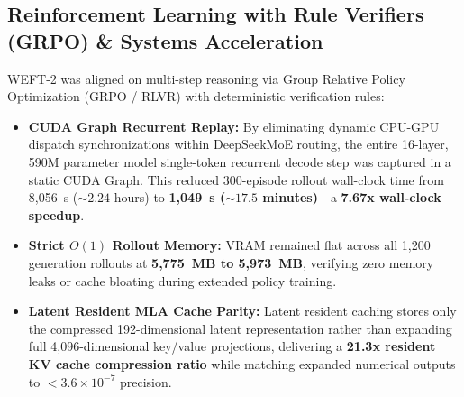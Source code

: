 \documentclass[11pt,a4paper]{article}
\begin{document}
\subsection{Reinforcement Learning with Rule Verifiers (GRPO) \& Systems Acceleration}
WEFT-2 was aligned on multi-step reasoning via Group Relative Policy Optimization (GRPO / RLVR) with deterministic verification rules:
\begin{itemize}
    \item \textbf{CUDA Graph Recurrent Replay:} By eliminating dynamic CPU-GPU dispatch synchronizations within DeepSeekMoE routing, the entire 16-layer, 590M parameter model single-token recurrent decode step was captured in a static CUDA Graph. This reduced 300-episode rollout wall-clock time from 8,056~s ($\sim 2.24$ hours) to \textbf{1,049~s ($\sim 17.5$ minutes)}---a \textbf{7.67x wall-clock speedup}.
    \item \textbf{Strict $O(1)$ Rollout Memory:} VRAM remained flat across all 1,200 generation rollouts at \textbf{5,775~MB to 5,973~MB}, verifying zero memory leaks or cache bloating during extended policy training.
    \item \textbf{Latent Resident MLA Cache Parity:} Latent resident caching stores only the compressed 192-dimensional latent representation rather than expanding full 4,096-dimensional key/value projections, delivering a \textbf{21.3x resident KV cache compression ratio} while matching expanded numerical outputs to $< 3.6 \times 10^{-7}$ precision.
\end{itemize}
\end{document}

